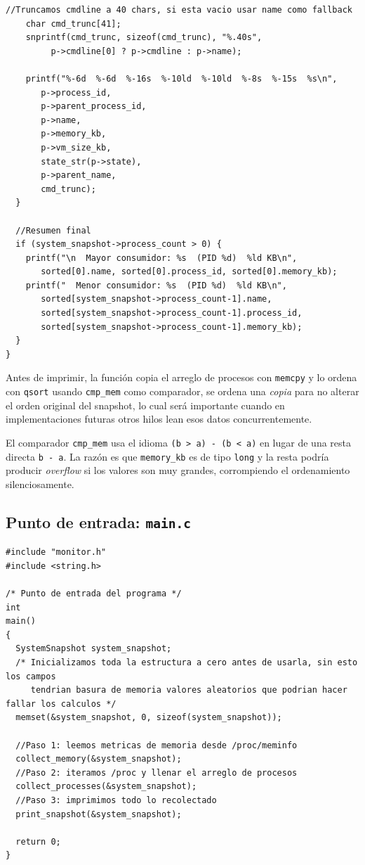 \documentclass[12pt,letterpaper]{article}
\begin{document}
\begin{lstlisting}[style=modernc, caption={\texttt{monitor.c} print\_snapshot() (líneas 124--180)}]
    //Truncamos cmdline a 40 chars, si esta vacio usar name como fallback
    char cmd_trunc[41];
    snprintf(cmd_trunc, sizeof(cmd_trunc), "%.40s",
	     p->cmdline[0] ? p->cmdline : p->name);
    
    printf("%-6d  %-6d  %-16s  %-10ld  %-10ld  %-8s  %-15s  %s\n",
	   p->process_id,
	   p->parent_process_id,
	   p->name,
	   p->memory_kb,
	   p->vm_size_kb,
	   state_str(p->state),
	   p->parent_name,
	   cmd_trunc);
  }

  //Resumen final
  if (system_snapshot->process_count > 0) {
    printf("\n  Mayor consumidor: %s  (PID %d)  %ld KB\n",
	   sorted[0].name, sorted[0].process_id, sorted[0].memory_kb);
    printf("  Menor consumidor: %s  (PID %d)  %ld KB\n",
	   sorted[system_snapshot->process_count-1].name,
	   sorted[system_snapshot->process_count-1].process_id,
	   sorted[system_snapshot->process_count-1].memory_kb);
  }
}
\end{lstlisting}

\bigskip

Antes de imprimir, la función copia el arreglo de procesos con \texttt{memcpy} y lo ordena con \texttt{qsort}
usando \texttt{cmp\_mem} como comparador, se ordena una \textit{copia} para no alterar el orden original del
snapshot, lo cual será importante cuando en implementaciones futuras otros hilos lean esos datos concurrentemente.

\medskip

El comparador \texttt{cmp\_mem} usa el idioma \texttt{(b > a) - (b < a)} en lugar de una resta directa
\texttt{b - a}. La razón es que \texttt{memory\_kb} es de tipo \texttt{long} y la resta podría producir
\textit{overflow} si los valores son muy grandes, corrompiendo el ordenamiento silenciosamente.

\subsection*{Punto de entrada: \texttt{main.c}}

\begin{lstlisting}[style=modernc, caption={\texttt{main.c} completo (líneas 1--17)}]
#include "monitor.h"
#include <string.h>

/* Punto de entrada del programa */
int
main()
{
  SystemSnapshot system_snapshot;
  /* Inicializamos toda la estructura a cero antes de usarla, sin esto los campos
     tendrian basura de memoria valores aleatorios que podrian hacer fallar los calculos */
  memset(&system_snapshot, 0, sizeof(system_snapshot));
  
  //Paso 1: leemos metricas de memoria desde /proc/meminfo
  collect_memory(&system_snapshot);
  //Paso 2: iteramos /proc y llenar el arreglo de procesos
  collect_processes(&system_snapshot);
  //Paso 3: imprimimos todo lo recolectado
  print_snapshot(&system_snapshot);

  return 0;
}
\end{lstlisting}
\end{document}

